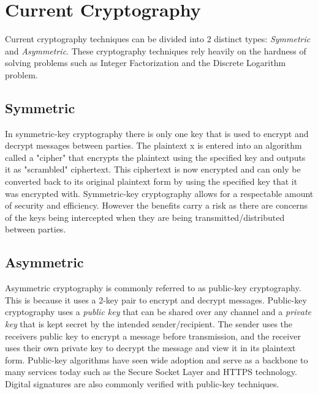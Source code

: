 \documentclass[journal]{IEEEtran}
\begin{document}
\section{Current Cryptography}
Current cryptography techniques can be divided into 2 distinct types: \emph{Symmetric} and 
\emph{Asymmetric}. These cryptography techniques rely heavily on the hardness of solving problems such as Integer Factorization and the Discrete 
Logarithm problem.

\subsection{Symmetric}
In symmetric-key cryptography there is only one key that is used to encrypt and decrypt messages between parties. 
The plaintext x is entered into an algorithm called a "cipher" that encrypts the plaintext using the specified key and outputs 
it as "scrambled" ciphertext. This ciphertext is now encrypted and can only be converted back to its original plaintext form by using the 
specified key that it was  encrypted with. Symmetric-key cryptography allows for a respectable amount of security and efficiency. 
However the benefits carry a risk as there are concerns of the keys being intercepted when they are being transmitted/distributed 
between parties. 
\subsection{Asymmetric}
Asymmetric cryptography is commonly referred to as public-key cryptography. This is because it uses a 2-key pair to encrypt and 
decrypt messages. Public-key cryptography uses a \emph{public key} that can be shared over any channel and a \emph{private key} 
that is kept secret by the intended sender/recipient. The sender uses the receivers public key to encrypt a message before transmission, 
and the receiver uses their own private key to decrypt the message and view it in its plaintext form. Public-key algorithms have seen 
wide adoption and serve as a backbone to many services today such as the Secure Socket Layer and HTTPS technology. 
Digital signatures are also commonly verified with public-key techniques. 
\end{document}
